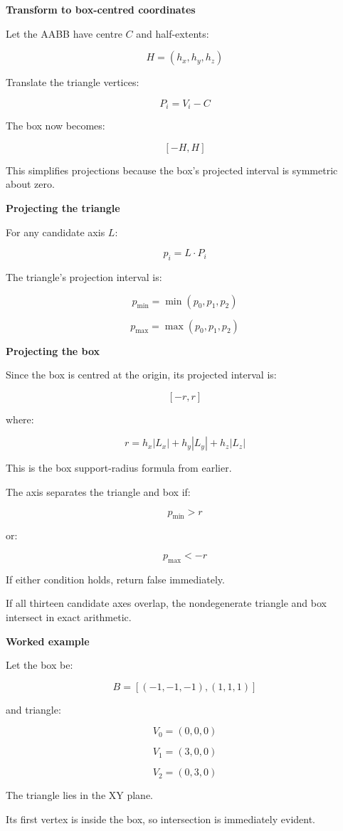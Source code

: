 \textbf{Transform to box-centred coordinates}

Let the AABB have centre \(C\) and half-extents:

\[
H=(h_x,h_y,h_z)
\]

Translate the triangle vertices:

\[
\boxed{ P_i=V_i-C }
\]

The box now becomes:

\[
[-H,H]
\]

This simplifies projections because the box's projected interval is symmetric about zero.

\textbf{Projecting the triangle}

For any candidate axis \(L\):

\[
p_i=L\cdot P_i
\]

The triangle's projection interval is:

\[
\boxed{ p_{\min}=\min(p_0,p_1,p_2) }
\]

\[
\boxed{ p_{\max}=\max(p_0,p_1,p_2) }
\]

\textbf{Projecting the box}

Since the box is centred at the origin, its projected interval is:

\[
[-r,r]
\]

where:

\[
\boxed{ r=h_x|L_x|+h_y|L_y|+h_z|L_z| }
\]

This is the box support-radius formula from earlier.

The axis separates the triangle and box if:

\[
\boxed{ p_{\min}>r }
\]

or:

\[
\boxed{ p_{\max}<-r }
\]

If either condition holds, return false immediately.

If all thirteen candidate axes overlap, the nondegenerate triangle and box intersect in exact arithmetic.

\textbf{Worked example}

Let the box be:

\[
B=[(-1,-1,-1),(1,1,1)]
\]

and triangle:

\[
V_0=(0,0,0)
\]

\[
V_1=(3,0,0)
\]

\[
V_2=(0,3,0)
\]

The triangle lies in the XY plane.

Its first vertex is inside the box, so intersection is immediately evident.

